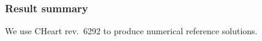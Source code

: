 \subsubsection{Result summary}
%
We use CHeart rev.\ 6292 to produce numerical reference solutions.
%


%
%
